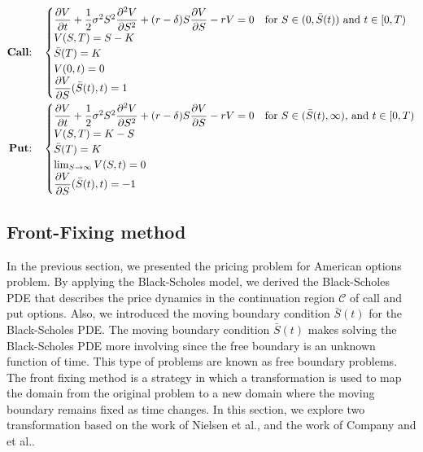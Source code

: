 \begin{subequations} \label{eq:blackscholes:preliminaries:american_options_pde_free_boundary_problem_full}
  \begin{align}
    \label{eq:blackscholes:preliminaries:call_american_options_pde_free_boundary_problem_full}
    \text{\textbf{Call}:} \quad &
    \begin{cases}
      \dfrac{\partial{V}}{\partial{t}} + \dfrac{1}{2}\sigma^{2} S^2 \dfrac{\partial^2{V}}{\partial{S}^2} + (r - \delta)S\dfrac{\partial{V}}{\partial{S}} - rV = 0 & \text{for $S \in (0,\bar{S}(t))$ and $t \in [0, T)$} \\ 
      V(S, T) = S - K \\
      \bar{S}(T) = K \\ 
      V(0, t) = 0 \\
      \dfrac{\partial{V}}{\partial{S}}(\bar{S}(t), t) = 1
    \end{cases} \\
    \text{\textbf{Put}:} \quad &
    \begin{cases}
      \dfrac{\partial{V}}{\partial{t}} + \dfrac{1}{2}\sigma^{2} S^2 \dfrac{\partial^2{V}}{\partial{S}^2} + (r - \delta)S\dfrac{\partial{V}}{\partial{S}} - rV = 0 & \text{for $S \in (\bar{S}(t), \infty)$, and $t \in [0, T)$} \\
      V(S, T) = K - S \\
      \bar{S}(T) = K \\ 
      \lim_{S\rightarrow\infty}V(S, t) = 0 \\ 
      \dfrac{\partial{V}}{\partial{S}}(\bar{S}(t), t) = -1
    \end{cases}
  \end{align}
\end{subequations}
\newpage
\subsection{Front-Fixing method}
In the previous section, we presented the pricing  problem for American options problem. By applying the Black-Scholes model, we derived the Black-Scholes PDE that describes the price dynamics in the continuation region $\mathcal{C}$ of call and put options. Also, we introduced the moving boundary condition $\bar{S}(t)$ for the Black-Scholes PDE. The moving boundary condition $\bar{S}(t)$ makes solving the Black-Scholes PDE more involving since the free boundary is an unknown function of time. This type of problems are known as free boundary problems. The front fixing method is a strategy in which a transformation is used to map the  domain from the original problem to a new domain where the moving boundary remains fixed as time changes. In this section, we explore two transformation based on the work of Nielsen et al.\cite{nielsen_2001}, and the work of Company and et al.\cite{company_egorova_jodar_2014}.

